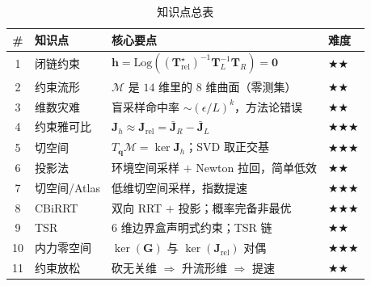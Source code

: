 \begin{table}[H]\centering\small
\caption{知识点总表}
\begin{tabular}{clll}
\toprule
\# & 知识点 & 核心要点 & 难度 \\
\midrule
1 & 闭链约束 & $\mathbf{h}=\mathrm{Log}((\mathbf{T}_{\text{rel}}^{\star})^{-1}\mathbf{T}_L^{-1}\mathbf{T}_R)=\mathbf{0}$ & $\bigstar\bigstar$ \\
2 & 约束流形 & $\mathcal{M}$ 是 $14$ 维里的 $8$ 维曲面（零测集） & $\bigstar\bigstar$ \\
3 & 维数灾难 & 盲采样命中率 $\sim(\epsilon/L)^k$，方法论错误 & $\bigstar\bigstar$ \\
4 & 约束雅可比 & $\mathbf{J}_h\approx\mathbf{J}_{\text{rel}}=\bar{\mathbf{J}}_R-\bar{\mathbf{J}}_L$ & $\bigstar\bigstar\bigstar$ \\
5 & 切空间 & $T_{\mathbf{q}}\mathcal{M}=\ker\mathbf{J}_h$；SVD 取正交基 & $\bigstar\bigstar\bigstar$ \\
6 & 投影法 & 环境空间采样 $+$ Newton 拉回，简单低效 & $\bigstar\bigstar$ \\
7 & 切空间/Atlas & 低维切空间采样，指数提速 & $\bigstar\bigstar\bigstar$ \\
8 & CBiRRT & 双向 RRT $+$ 投影；概率完备非最优 & $\bigstar\bigstar\bigstar$ \\
9 & TSR & $6$ 维边界盒声明式约束；TSR 链 & $\bigstar\bigstar$ \\
10 & 内力零空间 & $\ker(\mathbf{G})$ 与 $\ker(\mathbf{J}_{\text{rel}})$ 对偶 & $\bigstar\bigstar\bigstar$ \\
11 & 约束放松 & 砍无关维 $\Rightarrow$ 升流形维 $\Rightarrow$ 提速 & $\bigstar\bigstar$ \\
\bottomrule
\end{tabular}
\end{table}


